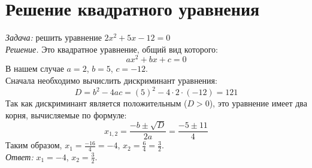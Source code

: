 \documentclass{article}
\begin{document}
\section{Решение квадратного уравнения}

\textit{Задача:} решить уравнение $2x^2+5x-12=0$\\
\hspace*{5mm}\textit{Решение.} Это квадратное уравнение, общий вид которого:
$$ax^2+bx+c=0$$
В нашем случае $a=2$, $b=5$, $c=-12$.\\
\hspace*{5mm}Сначала необходимо вычислить дискриминант уравнения:
$$D=b^2-4ac=(5)^2-4\cdot2\cdot(-12)=121$$
Так как дискриминант является положительным ($D>0$), это уравнение имеет два корня, вычисляемые по формуле:
$$x_{1,2}=\frac{-b\pm\sqrt{D}}{2a}=\frac{-5\pm11}{4}$$
Таким образом, $x_1=\frac{-16}{4}=-4$, $x_2=\frac{6}{4}=\frac{3}{2}$.\\
\hspace*{5mm}\textit{Ответ:} $x_1=-4$, $x_2=\frac{3}{2}$.
\end{document}
